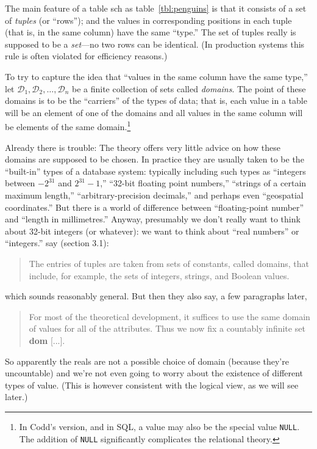 \documentclass[10pt, a4paper, twocolumn]{article}
\begin{document}
The main feature of a table sch as table~\ref{tbl:penguins} is that it consists
of a set of \emph{tuples} (or ``rows''); and the values in corresponding
positions in each tuple (that is, in the same column) have the same ``type.''
The set of tuples really is supposed to be a \emph{set}---no two rows can be
identical. (In production systems this rule is often violated for efficiency
reasons.)

To try to capture the idea that ``values in the same column have the same
type,'' let $\mathscr{D}_1, \mathscr{D}_2, \dots, \mathscr{D}_n$ be a finite
collection of sets called \emph{domains}. The point of these domains is to be
the ``carriers'' of the types of data; that is, each value in a table will be an
element of one of the domains and all values in the same column will be elements
of the same domain.\footnote{In Codd's version, and in SQL, a value may also be
  the special value \texttt{NULL}. The addition of \texttt{NULL} significantly
  complicates the relational theory.}

Already there is trouble: The theory offers very little advice on how these
domains are supposed to be chosen. In practice they are usually taken to be the
``built-in'' types of a database system: typically including such types as
``integers between $-2^{31}$ and $2^{31}-1$,'' ``32-bit floating point
numbers,'' ``strings of a certain maximum length,'' ``arbitrary-precision
decimals,'' and perhaps even ``geospatial coordinates.'' But there is a world of
difference between ``floating-point number'' and ``length in millimetres.''
Anyway, presumably we don't really want to think about 32-bit integers (or
whatever): we want to think about ``real numbers'' or ``integers.''
\textcite{abiteboul1995foundations} say (section 3.1):
\begin{quote}
  The entries of tuples are taken from sets of constants, called domains, that
  include, for example, the sets of integers, strings, and Boolean values.
\end{quote}
which sounds reasonably general. But then they also say, a few paragraphs later,
\begin{quote}
  For most of the theoretical development, it suffices to use the same domain of
  values for all of the attributes. Thus we now fix a countably infinite set
  \textbf{dom} [...].
\end{quote}
So apparently the reals are not a possible choice of domain (because they're
uncountable) and we're not even going to worry about the existence of different
types of value. (This is however consistent with the logical view, as we will
see later.)
\end{document}
